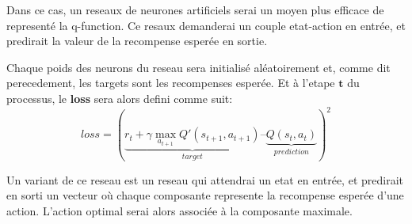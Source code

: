 \documentclass{article}
\begin{document}
Dans ce cas, un reseaux de neurones artificiels serai un moyen plus efficace de representé la q-function. Ce resaux demanderai un couple etat-action en entrée, et predirait la valeur de la recompense esperée en sortie.
\newline

Chaque poids des neurons du reseau sera initialisé aléatoirement et, comme dit perecedement, les targets sont les recompenses esperée. Et à l'etape $\textbf{t}$ du processus, le \textbf{loss} sera alors defini comme suit:
$$loss = (\underbrace{r_t + \gamma \max_{a_{t+1}} Q'(s_{t+1},a_{t+1})}_{target} – \underbrace{Q(s_t,a_t)}_{prediction})^2$$

Un variant de ce reseau est un reseau qui attendrai un etat en entrée, et predirait en sorti un vecteur où chaque composante represente la recompense esperée d'une action. L'action optimal serai alors associée à la composante maximale.
\end{document}
